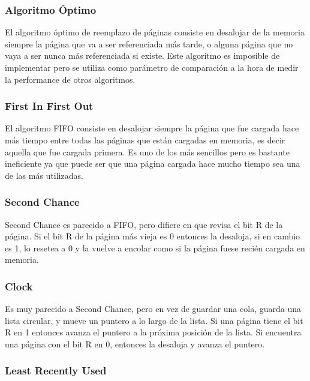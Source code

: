 \documentclass{article}
\begin{document}
\subsubsection{Algoritmo \'Optimo}

El algoritmo \'optimo de reemplazo de p\'aginas consiste en desalojar de la memoria siempre la p\'agina que va a ser referenciada m\'as tarde, o alguna p\'agina que no vaya a ser nunca m\'as referenciada si existe. Este algoritmo es imposible de implementar pero se utiliza como parámetro de comparación a la hora de medir la performance de otros algoritmos.

\subsubsection{First In First Out}

El algoritmo FIFO consiste en desalojar siempre la p\'agina que fue cargada hace m\'as tiempo entre todas las p\'aginas que est\'an cargadas en memoria, es decir aquella que fue cargada primera. Es uno de los m\'as sencillos pero es bastante ineficiente ya que puede ser que una p\'agina cargada hace mucho tiempo sea una de las m\'as utilizadas.

\subsubsection{Second Chance}

Second Chance es parecido a FIFO, pero difiere en que revisa el bit R de la p\'agina. Si el bit R de la p\'agina m\'as vieja es 0 entonces la desaloja, si en cambio es 1, lo resetea a 0 y la vuelve a encolar como si la p\'agina fuese reci\'en cargada en memoria.

\subsubsection{Clock}

Es muy parecido a Second Chance, pero en vez de guardar una cola, guarda una lista circular, y mueve un puntero a lo largo de la lista. Si una p\'agina tiene el bit R en 1 entonces avanza el puntero a la pr\'oxima posici\'on de la lista. Si encuentra una p\'agina con el bit R en 0, entonces la desaloja y avanza el puntero.

\subsubsection{Least Recently Used}
\end{document}
